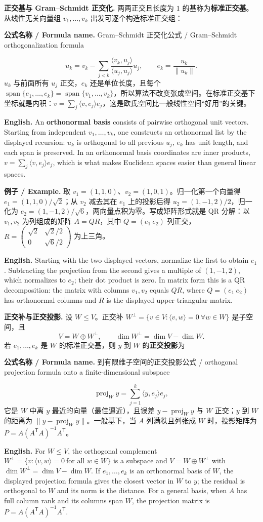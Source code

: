 \documentclass[UTF8,11pt,a4paper]{ctexart}
\newcommand{\EN}[1]{\par\noindent\textbf{English.} #1\par}
\newcommand{\FORMULA}[2]{\par\noindent\textbf{公式名称 / Formula name.} #1 / #2\par}
\newcommand{\EX}[2]{\par\noindent\textbf{例子 / Example.} #1\par\EN{#2}}
\begin{document}
\noindent\textbf{正交基与 Gram--Schmidt 正交化.} 两两正交且长度为 $1$ 的基称为\textbf{标准正交基}。从线性无关向量组 $v_1,\dots,v_k$ 出发可逐个构造标准正交组：
\FORMULA{Gram--Schmidt 正交化公式}{Gram--Schmidt orthogonalization formula}
\[
u_k=v_k-\sum_{j<k}\frac{\langle v_k,u_j\rangle}{\langle u_j,u_j\rangle}u_j,\qquad e_k=\frac{u_k}{\|u_k\|}.
\]
$u_k$ 与前面所有 $u_j$ 正交，$e_k$ 还是单位长度，且每个 $\operatorname{span}\{e_1,\dots,e_k\}=\operatorname{span}\{v_1,\dots,v_k\}$，所以算法不改变张成空间。在标准正交基下坐标就是内积：$v=\sum_j\langle v,e_j\rangle e_j$，这是欧氏空间比一般线性空间“好用”的关键。
\EN{An \textbf{orthonormal basis} consists of pairwise orthogonal unit vectors. Starting from independent $v_1,\dots,v_k$, one constructs an orthonormal list by the displayed recursion: $u_k$ is orthogonal to all previous $u_j$, $e_k$ has unit length, and each span is preserved. In an orthonormal basis coordinates are inner products, $v=\sum_j\langle v,e_j\rangle e_j$, which is what makes Euclidean spaces easier than general linear spaces.}
\EX{取 $v_1=(1,1,0)$、$v_2=(1,0,1)$。归一化第一个向量得 $e_1=(1,1,0)/\sqrt2$；从 $v_2$ 减去其在 $e_1$ 上的投影后得 $u_2=(1,-1,2)/2$，归一化为 $e_2=(1,-1,2)/\sqrt6$，两向量点积为零。写成矩阵形式就是 QR 分解：以 $v_1,v_2$ 为列组成的矩阵 $A=QR$，其中 $Q=(e_1\ e_2)$ 列正交，$R=\begin{pmatrix}\sqrt2&\sqrt2/2\\0&\sqrt6/2\end{pmatrix}$ 为上三角。}{Starting with the two displayed vectors, normalize the first to obtain $e_1$. Subtracting the projection from the second gives a multiple of $(1,-1,2)$, which normalizes to $e_2$; their dot product is zero. In matrix form this is a QR decomposition: the matrix with columns $v_1,v_2$ equals $QR$, where $Q=(e_1\ e_2)$ has orthonormal columns and $R$ is the displayed upper-triangular matrix.}
\noindent\textbf{正交补与正交投影.} 设 $W\le V$。正交补 $W^\perp=\{v\in V:\langle v,w\rangle=0\ \forall w\in W\}$ 是子空间，且
\[
V=W\oplus W^\perp,\qquad \dim W^\perp=\dim V-\dim W.
\]
若 $e_1,\dots,e_k$ 是 $W$ 的标准正交基，则 $y$ 到 $W$ 的\textbf{正交投影}为
\FORMULA{到有限维子空间的正交投影公式}{orthogonal projection formula onto a finite-dimensional subspace}
\[
\operatorname{proj}_W y=\sum_{j=1}^k\langle y,e_j\rangle e_j,
\]
它是 $W$ 中离 $y$ 最近的向量（最佳逼近），且误差 $y-\operatorname{proj}_Wy$ 与 $W$ 正交；$y$ 到 $W$ 的距离为 $\|y-\operatorname{proj}_Wy\|$。一般基下，当 $A$ 列满秩且列张成 $W$ 时，投影矩阵为 $P=A(A^{\mathsf T}A)^{-1}A^{\mathsf T}$。
\EN{For $W\le V$, the orthogonal complement $W^\perp=\{v:\langle v,w\rangle=0\ \text{for all } w\in W\}$ is a subspace and $V=W\oplus W^\perp$ with $\dim W^\perp=\dim V-\dim W$. If $e_1,\dots,e_k$ is an orthonormal basis of $W$, the displayed projection formula gives the closest vector in $W$ to $y$; the residual is orthogonal to $W$ and its norm is the distance. For a general basis, when $A$ has full column rank and its columns span $W$, the projection matrix is $P=A(A^{\mathsf T}A)^{-1}A^{\mathsf T}$.}
\end{document}
